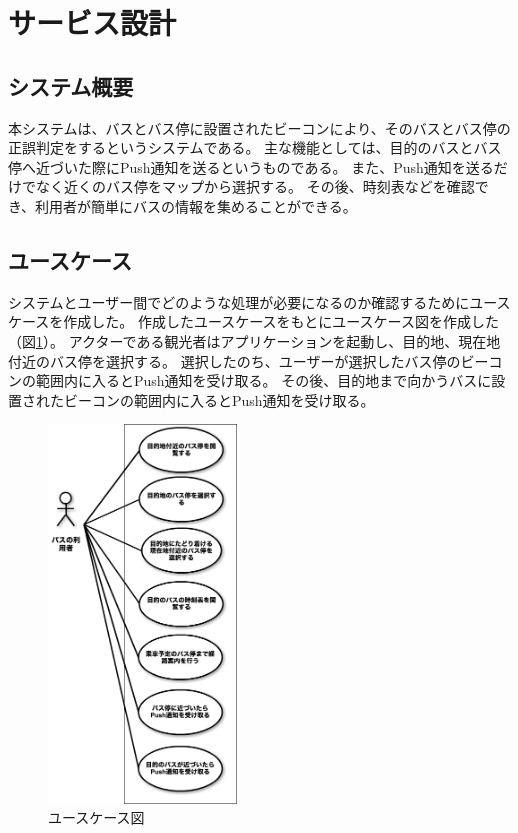 \documentclass[openany,11pt,papersize]{jsbook}
\begin{document}


\section{サービス設計}

\subsection{システム概要}
本システムは、バスとバス停に設置されたビーコンにより、そのバスとバス停の正誤判定をするというシステムである。
主な機能としては、目的のバスとバス停へ近づいた際にPush通知を送るというものである。
また、Push通知を送るだけでなく近くのバス停をマップから選択する。
その後、時刻表などを確認でき、利用者が簡単にバスの情報を集めることができる。


\subsection{ユースケース}
システムとユーザー間でどのような処理が必要になるのか確認するためにユースケースを作成した。
作成したユースケースをもとにユースケース図を作成した（図\ref{fig:usecase}）。
アクターである観光者はアプリケーションを起動し、目的地、現在地付近のバス停を選択する。
選択したのち、ユーザーが選択したバス停のビーコンの範囲内に入るとPush通知を受け取る。
その後、目的地まで向かうバスに設置されたビーコンの範囲内に入るとPush通知を受け取る。

\begin{figure}[htbp]
  \begin{center}
    \includegraphics[clip,width=5.0cm]{img/usecase.png}
    \caption{ユースケース図}
    \label{fig:usecase}
  \end{center}
\end{figure}
\end{document}
